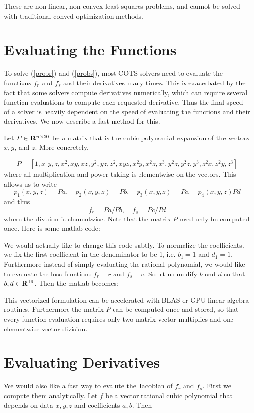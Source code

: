 \documentclass{article}
\begin{document}
  These are non-linear, non-convex least squares problems, and cannot be solved with traditional
  conved optimization methods.
  \section{Evaluating the Functions}
  To solve (\ref{probr}) and (\ref{probs}), most COTS solvers need to evaluate the functions $f_r$ and 
  $f_s$ and their derivatives many times. This is exacerbated by the fact that some solvers
  compute derivatives numerically, which can require several function evaluations to compute
  each requested derivative. Thus the final speed of a solver is heavily dependent on the speed
  of evaluating the functions and their derivatives. We now describe a fast method for this.

  Let $P \in \mathbf{R}^{n \times 20}$ be a matrix that is the cubic polynomial expansion of
  the vectors $x,y$, and $z$. More concretely,

  \[
    P = [1,x,y,z,x^2,xy,xz,y^2,yz,z^2,xyz,x^2y,x^2z,x^3,y^2z,y^2z,y^3,z^2x,z^2y,z^3]
  \]
  where all multiplication and power-taking is elementwise on the vectors.
  This allows us to write
  \[
    p_1(x,y,z) = Pa, \quad p_2(x,y,z) = Pb, \quad p_3(x,y,z) = Pc, \quad p_4(x,y,z)Pd
  \]
  and thus
  \[
    f_r = Pa/Pb , \quad f_s = Pc/Pd 
  \]
  where the division is elementwise. Note that the matrix $P$ need only be computed once.
  Here is some matlab code:
  
  
  We would actually like to change this code subtly. To normalize the coefficients, we fix
  the first coefficient in the denominator to be 1, i.e. $b_1 = 1$ and $d_1 = 1$. Furthermore
  instead of simply evaluating the rational polynomial, we would like to evaluate the loss
  functions $f_r -r$ and $f_s -s$. So let us modify $b$ and $d$ so that $b,d \in \mathbf{R}^{19}$.
  Then the matlab becomes:
  
  This vectorized formulation can be accelerated with BLAS or GPU linear algebra routines. Furthermore
  the matrix $P$ can be computed once and stored, so that every function evaluation requires
  only two matrix-vector multiplies and one elementwise vector division.
  \section{Evaluating Derivatives}
  We would also like a fast way to evalute the Jacobian of $f_r$ and $f_s$. First we compute
  them analytically. Let $f$ be a vector rational cubic polynomial that depends on data $x,y,z$
  and coefficients $a,b$. Then
  
\end{document}

